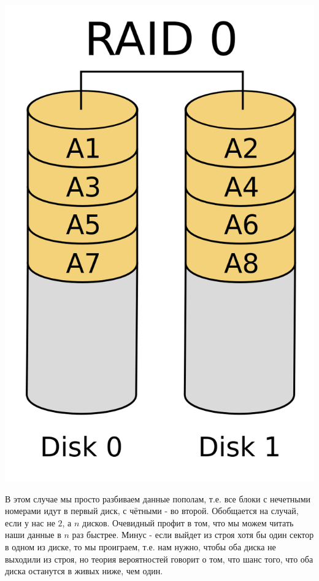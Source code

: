 \documentclass[12pt, a4paper]{article}
\begin{document}
\begin{center}
\includegraphics[scale=0.1]{./images/RAID0.png}
\end{center}

В этом случае мы просто разбиваем данные пополам, т.е. все блоки с нечетными номерами идут в первый диск, с чётными - во второй. Обобщается на случай, если у нас не $2$, а $n$ дисков. Очевидный профит в том, что мы можем читать наши данные в $n$ раз быстрее. Минус - если выйдет из строя хотя бы один сектор в одном из диске, то мы проиграем, т.е. нам нужно, чтобы оба диска не выходили из строя, но теория вероятностей говорит о том, что шанс того, что оба диска останутся в живых ниже, чем один.
\end{document}
